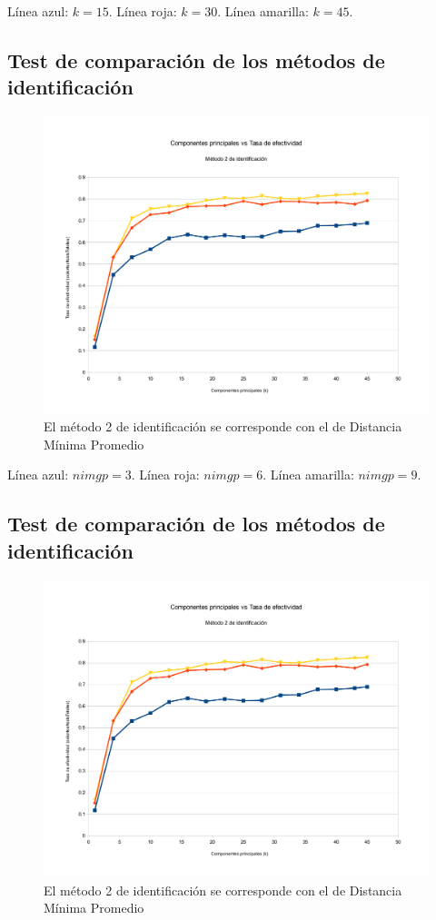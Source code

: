 Línea azul: $k = 15$. Línea roja: $k = 30$. Línea amarilla: $k = 45$.

\subsection{Test de comparación de los métodos de identificación}
\begin{figure}[H]{}
\centering
\includegraphics[scale=0.5]{graphs/componentesPrincipalesVsTasaDeEfectividadM2.pdf}
\caption{El método 2 de identificación se corresponde con el de Distancia Mínima Promedio}
\label{CPvsTE}
\end{figure}

Línea azul: $nimgp = 3$. Línea roja: $nimgp = 6$. Línea amarilla: $nimgp = 9$.

\subsection{Test de comparación de los métodos de identificación}
\begin{figure}[H]{}
\centering
\includegraphics[scale=0.5]{graphs/componentesPrincipalesVsTasaDeEfectividadM2.pdf}
\caption{El método 2 de identificación se corresponde con el de Distancia Mínima Promedio}
\label{CPvsTE}
\end{figure}

